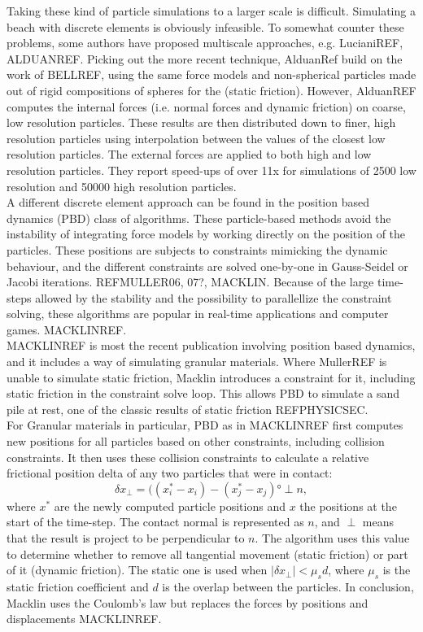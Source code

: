 Taking these kind of particle simulations to a larger scale is difficult. Simulating a beach with discrete elements is obviously infeasible. To somewhat counter these problems, some authors have proposed multiscale approaches, e.g. LucianiREF, ALDUANREF. Picking out the more recent technique, AlduanRef build on the work of BELLREF, using the same force models and non-spherical particles made out of rigid compositions of spheres for the (static friction). However, AlduanREF computes the internal forces (i.e. normal forces and dynamic friction) on coarse, low resolution particles. These results are then distributed down to finer, high resolution particles using interpolation between the values of the closest low resolution particles. The external forces are applied to both high and low resolution particles. They report speed-ups of over 11x for simulations of 2500 low resolution and 50000 high resolution particles.\\

A different discrete element approach can be found in the position based dynamics (PBD) class of algorithms. These particle-based methods avoid the instability of integrating force models by working directly on the position of the particles. These positions are subjects to constraints mimicking the dynamic behaviour, and the different constraints are solved one-by-one in Gauss-Seidel or Jacobi iterations. REFMULLER06, 07?, MACKLIN. Because of the large time-steps allowed by the stability and the possibility to parallellize the constraint solving, these algorithms are popular in real-time applications and computer games. MACKLINREF.\\

MACKLINREF is most the recent publication involving position based dynamics, and it includes a way of simulating granular materials. Where MullerREF is unable to simulate static friction, Macklin introduces a constraint for it, including static friction in the constraint solve loop. This allows PBD to simulate a sand pile at rest, one of the classic results of static friction REFPHYSICSEC.\\

For Granular materials in particular, PBD as in MACKLINREF first computes new positions for all particles based on other constraints, including collision constraints. It then uses these collision constraints to calculate a relative frictional position delta of any two particles that were in contact:
\begin{equation}
\delta x_{\perp} = ( (x_i^* - x_i) - (x_j^* - x_j) ° \perp n,
\end{equation}
where $x^*$ are the newly computed particle positions and $x$ the positions at the start of the time-step. The contact normal is represented as $n$, and $\perp$ means that the result is project to be perpendicular to $n$. The algorithm uses this value to determine whether to remove all tangential movement (static friction) or part of it (dynamic friction). The static one is used when $|\delta x_{\perp}| < \mu_s d$, where $\mu_s$ is the static friction coefficient and $d$ is the overlap between the particles. In conclusion, Macklin uses the Coulomb's law but replaces the forces by positions and displacements MACKLINREF.\\

